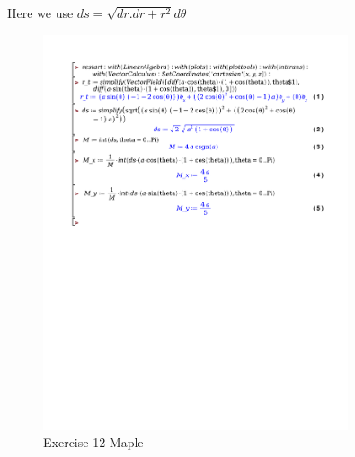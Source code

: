 \documentclass[a4paper]{report}
\begin{document}
Here we use $ds = \sqrt{dr . dr + r^2} d\theta$

\begin{figure}[H]
	\centering
	\includegraphics[width=0.8\textwidth]{exercises/huis_6_ex_12.pdf}
	\caption{Exercise 12 Maple}
	\label{fig:huis_6_ex_12_maple}
\end{figure}
\end{document}

